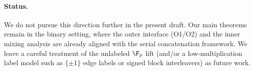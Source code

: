 \paragraph{Status.}
We do not pursue this direction further in the present draft. Our main theorems remain in the binary setting, where the
outer interface (O1/O2) and the inner mixing analysis are already aligned with the serial concatenation framework.
We leave a careful treatment of the unlabeled $\F_p$ lift (and/or a low-multiplication label model such as $\{\pm 1\}$
edge labels or signed block interleavers) as future work.

%
